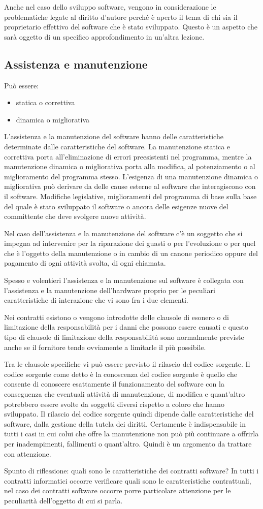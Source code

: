 Anche nel caso dello sviluppo software, vengono in considerazione le problematiche legate al diritto d'autore perché è aperto il tema di chi sia il proprietario effettivo del software che è stato sviluppato. Questo è un aspetto che sarà oggetto di un specifico approfondimento in un'altra lezione. 

\subsection{Assistenza e manutenzione}
Può essere:

\begin{itemize}
    \item statica o correttiva
    \item dinamica o migliorativa
\end{itemize}

L'assistenza e la manutenzione del software hanno delle caratteristiche determinate dalle caratteristiche del software. La manutenzione statica e correttiva porta all'eliminazione di errori preesistenti nel programma, mentre la manutenzione dinamica o migliorativa porta alla modifica, al potenziamento o al miglioramento del programma stesso. L'esigenza di una manutenzione dinamica o migliorativa può derivare da delle cause esterne al software che interagiscono con il software. Modifiche legislative, miglioramenti del programma di base sulla base del quale è stato sviluppato il software o ancora delle esigenze nuove del committente che deve svolgere nuove attività. 

Nel caso dell'assistenza e la manutenzione del software c'è un soggetto che si impegna ad intervenire per la riparazione dei guasti o per l'evoluzione o per quel che è l'oggetto della manutenzione o in cambio di un canone periodico oppure del pagamento di ogni attività svolta, di ogni chiamata. 

Spesso e volentieri l'assistenza e la manutenzione sul software è collegata con l'assistenza e la manutenzione dell'hardware proprio per le peculiari caratteristiche di interazione che vi sono fra i due elementi. 

Nei contratti esistono o vengono introdotte delle clausole di esonero o di limitazione della responsabilità per i danni che possono essere causati e questo tipo di clausole di limitazione della responsabilità sono normalmente previste anche se il fornitore tende ovviamente a limitarle il più possibile. 

Tra le clausole specifiche vi può essere previsto il rilascio del codice sorgente. Il codice sorgente come detto è la conoscenza del codice sorgente è quello che consente di conoscere esattamente il funzionamento del software con la conseguenza che eventuali attività di manutenzione, di modifica e quant'altro potrebbero essere svolte da soggetti diversi rispetto a coloro che hanno sviluppato. Il rilascio del codice sorgente quindi dipende dalle caratteristiche del software, dalla gestione della tutela dei diritti. Certamente è indispensabile in tutti i casi in cui colui che offre la manutenzione non può più continuare a offrirla per inadempimenti, fallimenti o quant'altro. Quindi è un argomento da trattare con attenzione. 

Spunto di riflessione: quali sono le caratteristiche dei contratti software? In tutti i contratti informatici occorre verificare quali sono le caratteristiche contrattuali, nel caso dei contratti software occorre porre particolare attenzione per le peculiarità dell'oggetto di cui si parla.

